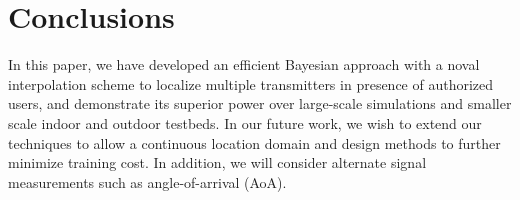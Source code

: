\section{Conclusions}

In this paper, we have developed an efficient Bayesian approach with a noval interpolation scheme to
localize multiple transmitters in presence of authorized users, and
demonstrate its superior power over large-scale simulations and smaller
scale indoor and outdoor testbeds.
In our future work, we wish to extend our techniques to allow a
continuous location domain and design methods to further minimize
training cost. In addition, we will consider alternate signal
measurements such as angle-of-arrival (AoA).




